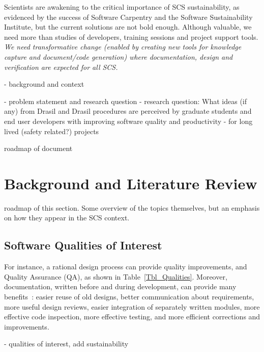 \documentclass[12pt]{article}
\begin{document}
Scientists are awakening to the critical importance of SCS sustainability, as
evidenced by the success of Software Carpentry and the Software
Sustainability Institute, but the current solutions are not bold enough.
Although valuable, we need more than studies of developers, training sessions
and project support tools.  \emph{We need transformative change (enabled by
  creating new tools for knowledge capture and document/code generation) where
  documentation, design and verification are expected for all SCS.}

- background and context

- problem statement and research question
- research question: What ideas (if any) from Drasil and Drasil procedures are perceived
by graduate students and end user developers with improving software quality and
productivity - for long lived (safety related?) projects

roadmap of document

\section{Background and Literature Review}

roadmap of this section.  Some overview of the topics themselves, but an
emphasis on how they appear in the SCS context.

\subsection{Software Qualities of Interest}

For instance,
a rational design process can provide quality improvements, and Quality
Assurance (QA), as shown in Table~\ref{Tbl_Qualities}.  Moreover, documentation,
written before and during development, can provide many
benefits~\cite{Parnas2010}: easier reuse of old designs, better communication
about requirements, more useful design reviews, easier integration of separately
written modules, more effective code inspection, more effective testing, and
more efficient corrections and improvements.

- qualities of interest, add sustainability
\end{document}
